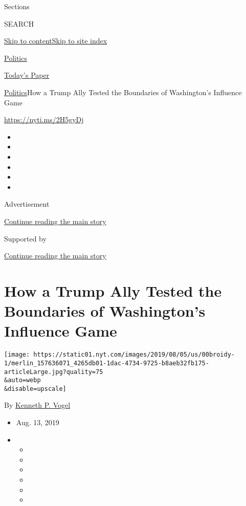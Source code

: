 Sections

SEARCH

\protect\hyperlink{site-content}{Skip to
content}\protect\hyperlink{site-index}{Skip to site index}

\href{https://www.nytimes.com/section/politics}{Politics}

\href{https://myaccount.nytimes.com/auth/login?response_type=cookie\&client_id=vi}{}

\href{https://www.nytimes.com/section/todayspaper}{Today's Paper}

\href{/section/politics}{Politics}\textbar{}How a Trump Ally Tested the
Boundaries of Washington's Influence Game

\url{https://nyti.ms/2H5gyDj}

\begin{itemize}
\item
\item
\item
\item
\item
\item
\end{itemize}

Advertisement

\protect\hyperlink{after-top}{Continue reading the main story}

Supported by

\protect\hyperlink{after-sponsor}{Continue reading the main story}

\hypertarget{how-a-trump-ally-tested-the-boundaries-of-washingtons-influence-game}{%
\section{How a Trump Ally Tested the Boundaries of Washington's
Influence
Game}\label{how-a-trump-ally-tested-the-boundaries-of-washingtons-influence-game}}

\texttt{[image: https://static01.nyt.com/images/2019/08/05/us/00broidy-1/merlin\_157636071\_4265db01-1dac-4734-9725-b8aeb32fb175-articleLarge.jpg?quality=75\\\&auto=webp\\\&disable=upscale]}

By \href{https://www.nytimes.com/by/kenneth-p-vogel}{Kenneth P. Vogel}

\begin{itemize}
\item
  Aug. 13, 2019
\item
  \begin{itemize}
  \item
  \item
  \item
  \item
  \item
  \item
  \end{itemize}
\end{itemize}


